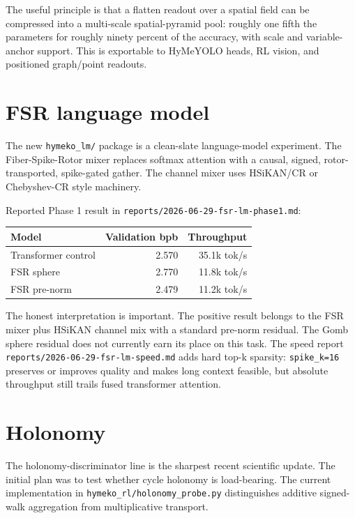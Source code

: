 \documentclass[11pt]{article}
\newcommand{\pathref}[1]{\nolinkurl{#1}}
\begin{document}
The useful principle is that a flatten readout over a spatial field can be
compressed into a multi-scale spatial-pyramid pool: roughly one fifth the
parameters for roughly ninety percent of the accuracy, with scale and
variable-anchor support. This is exportable to HyMeYOLO heads, RL vision, and
positioned graph/point readouts.

\section{FSR language model}

The new \pathref{hymeko_lm/} package is a clean-slate language-model experiment.
The Fiber-Spike-Rotor mixer replaces softmax attention with a causal,
signed, rotor-transported, spike-gated gather. The channel mixer uses HSiKAN/CR
or Chebyshev-CR style machinery.

Reported Phase 1 result in \pathref{reports/2026-06-29-fsr-lm-phase1.md}:
\begin{center}\small
\begin{tabular}{lrr}
\toprule
Model & Validation bpb & Throughput \\
\midrule
Transformer control & 2.570 & 35.1k tok/s \\
FSR sphere & 2.770 & 11.8k tok/s \\
FSR pre-norm & 2.479 & 11.2k tok/s \\
\bottomrule
\end{tabular}
\end{center}

The honest interpretation is important. The positive result belongs to the FSR
mixer plus HSiKAN channel mix with a standard pre-norm residual. The Gomb sphere
residual does not currently earn its place on this task. The speed report
\pathref{reports/2026-06-29-fsr-lm-speed.md} adds hard top-k sparsity:
\pathref{spike_k=16} preserves or improves quality and makes long context
feasible, but absolute throughput still trails fused transformer attention.

\section{Holonomy}

The holonomy-discriminator line is the sharpest recent scientific update. The
initial plan was to test whether cycle holonomy is load-bearing. The current
implementation in \pathref{hymeko_rl/holonomy_probe.py} distinguishes additive
signed-walk aggregation from multiplicative transport.
\end{document}
